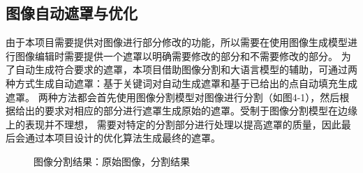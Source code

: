 \documentclass[a4paper,AutoFakeBold,oneside,12pt]{book}
\begin{document}
\subsection{图像自动遮罩与优化}
由于本项目需要提供对图像进行部分修改的功能，所以需要在使用图像生成模型进行图像编辑时需要提供一个遮罩以明确需要修改的部分和不需要修改的部分。
为了自动生成符合要求的遮罩，本项目借助图像分割和大语言模型的辅助，可通过两种方式生成自动遮罩：基于关键词对自动生成遮罩和基于已给出的点自动填充生成遮罩。
两种方法都会首先使用图像分割模型对图像进行分割（如图4-1），然后根据给出的要求对相应的部分进行遮罩生成原始的遮罩。受制于图像分割模型在边缘上的表现并不理想，
需要对特定的分割部分进行处理以提高遮罩的质量，因此最后会通过本项目设计的优化算法生成最终的遮罩。
\begin{figure}[!htbp]
    \centering
    \quad %
    \caption{图像分割结果：\protect{}原始图像，\protect{}分割结果} %
    \label{Fig:Segment} %
\end{figure}
\end{document}
